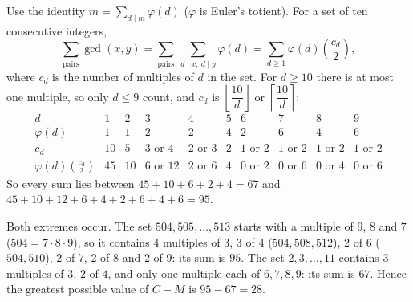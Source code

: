 Use the identity $m=\sum_{d\mid m}\varphi(d)$ ($\varphi$ is Euler's totient). For a set of ten consecutive integers,
\[
\sum_{\text{pairs}}\gcd(x,y)=\sum_{\text{pairs}}\ \sum_{d\mid x,\ d\mid y}\varphi(d)=\sum_{d\ge1}\varphi(d)\binom{c_d}{2},
\]
where $c_d$ is the number of multiples of $d$ in the set. For $d\ge10$ there is at most one multiple, so only $d\le9$ count, and $c_d$ is $\left\lfloor\dfrac{10}{d}\right\rfloor$ or $\left\lceil\dfrac{10}{d}\right\rceil$:
\[
\begin{array}{c|ccccccccc}
d&1&2&3&4&5&6&7&8&9\\\hline
\varphi(d)&1&1&2&2&4&2&6&4&6\\
c_d&10&5&3\text{ or }4&2\text{ or }3&2&1\text{ or }2&1\text{ or }2&1\text{ or }2&1\text{ or }2\\
\varphi(d)\binom{c_d}2&45&10&6\text{ or }12&2\text{ or }6&4&0\text{ or }2&0\text{ or }6&0\text{ or }4&0\text{ or }6
\end{array}
\]
So every sum lies between $45+10+6+2+4=67$ and $45+10+12+6+4+2+6+4+6=95$.

Both extremes occur. The set $504,505,\dots,513$ starts with a multiple of $9$, $8$ and $7$ ($504=7\cdot8\cdot9$), so it contains $4$ multiples of $3$, $3$ of $4$ ($504,508,512$), $2$ of $6$ ($504,510$), $2$ of $7$, $2$ of $8$ and $2$ of $9$: its sum is $95$. The set $2,3,\dots,11$ contains $3$ multiples of $3$, $2$ of $4$, and only one multiple each of $6,7,8,9$: its sum is $67$. Hence the greatest possible value of $C-M$ is $95-67=\boxed{28}$.
